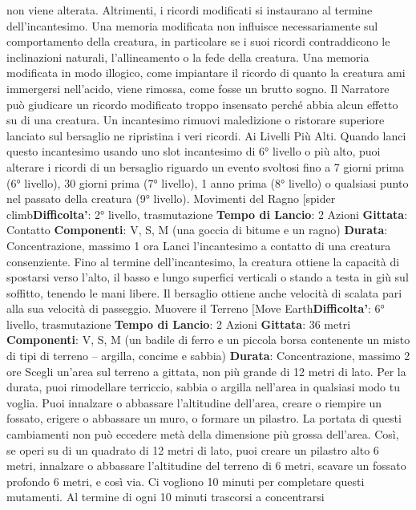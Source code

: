 \begin{multicols}{2}
non viene alterata. Altrimenti, i ricordi modificati si
instaurano al termine dell’incantesimo.
Una memoria modificata non influisce necessariamente
sul comportamento della creatura, in particolare se i
suoi ricordi contraddicono le inclinazioni naturali,
l’allineamento o la fede della creatura. Una memoria
modificata in modo illogico, come impiantare il ricordo di
quanto la creatura ami immergersi nell’acido, viene
rimossa, come fosse un brutto sogno. Il Narratore può
giudicare un ricordo modificato troppo insensato perché
abbia alcun effetto su di una creatura.
Un incantesimo rimuovi maledizione o ristorare
superiore lanciato sul bersaglio ne ripristina i veri
ricordi.
Ai Livelli Più Alti. Quando lanci questo incantesimo
usando uno slot incantesimo di 6° livello o più alto, puoi
alterare i ricordi di un bersaglio riguardo un evento
svoltosi fino a 7 giorni prima (6° livello), 30 giorni prima
(7° livello), 1 anno prima (8° livello) o qualsiasi punto
nel passato della creatura (9° livello).
Movimenti del Ragno
[spider climb\textbf{Difficolta'}:
2° livello, trasmutazione
\textbf{Tempo di Lancio}: 2 Azioni
\textbf{Gittata}: Contatto
\textbf{Componenti}: V, S, M (una goccia di bitume e un
ragno)
\textbf{Durata}: Concentrazione, massimo 1 ora
Lanci l’incantesimo a contatto di una creatura
consenziente. Fino al termine dell’incantesimo, la
creatura ottiene la capacità di spostarsi verso l’alto, il
basso e lungo superfici verticali o stando a testa in giù
sul soffitto, tenendo le mani libere. Il bersaglio ottiene
anche velocità di scalata pari alla sua velocità di
passeggio.
Muovere il Terreno
[Move Earth\textbf{Difficolta'}:
6° livello, trasmutazione
\textbf{Tempo di Lancio}: 2 Azioni
\textbf{Gittata}: 36 metri
\textbf{Componenti}: V, S, M (un badile di ferro e un piccola
borsa contenente un misto di tipi di terreno – argilla,
concime e sabbia)
\textbf{Durata}: Concentrazione, massimo 2 ore
Scegli un’area sul terreno a gittata, non più grande di
12 metri di lato. Per la durata, puoi rimodellare terriccio,
sabbia o argilla nell’area in qualsiasi modo tu voglia.
Puoi innalzare o abbassare l’altitudine dell’area, creare
o riempire un fossato, erigere o abbassare un muro, o
formare un pilastro. La portata di questi cambiamenti
non può eccedere metà della dimensione più grossa
dell’area. Così, se operi su di un quadrato di 12 metri di
lato, puoi creare un pilastro alto 6 metri, innalzare o
abbassare l’altitudine del terreno di 6 metri, scavare un
fossato profondo 6 metri, e così via. Ci vogliono 10
minuti per completare questi mutamenti.
Al termine di ogni 10 minuti trascorsi a concentrarsi

\end{multicols}
